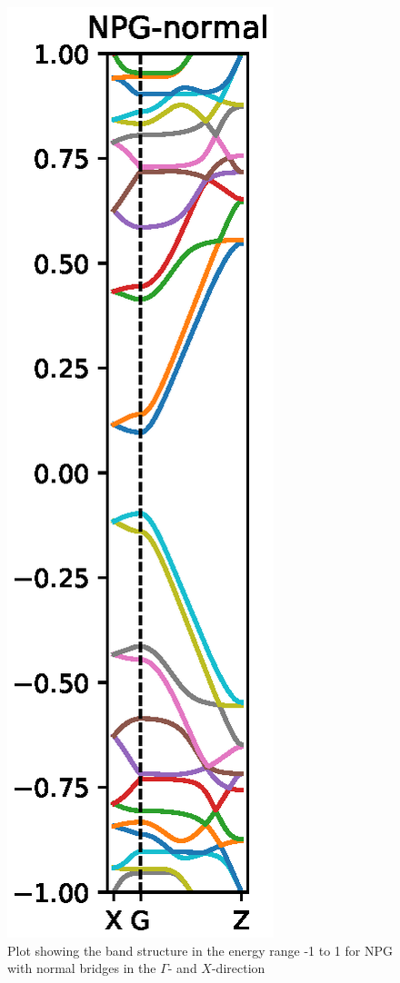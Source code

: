 \begin{figure}[H]
    \centering
    \includegraphics{Figures/name/FabNPGBS.eps}
    \caption{Plot showing the band structure in the energy range -1 to 1 for NPG with normal bridges in the \(\Gamma\)- and \(X\)-direction}
    \label{Fab}
\end{figure}

